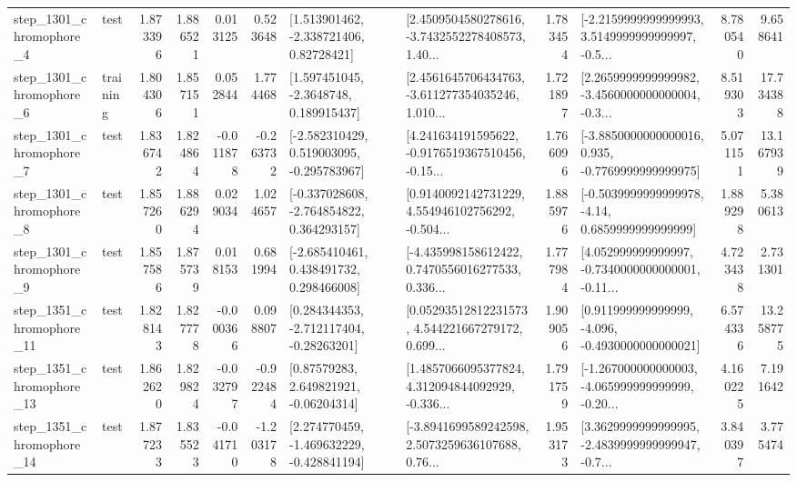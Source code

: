 \begin{tabular}{llrrrrllrlrr}
  step\_1301\_chromophore\_4 &      test &      1.873396 &    1.886521 &      0.013125 &  0.523648 &     [1.513901462, -2.338721406, 0.82728421] &  [2.4509504580278616, -3.7432552278408573, 1.40... &       1.783454 &  [-2.2159999999999993, 3.5149999999999997, -0.5... &            8.780540 &          9.658641 \\
  step\_1301\_chromophore\_6 &  training &      1.804306 &    1.857151 &      0.052844 &  1.774468 &      [1.597451045, -2.3648748, 0.189915437] &  [2.4561645706434763, -3.611277354035246, 1.010... &       1.721897 &  [2.2659999999999982, -3.4560000000000004, -0.3... &            8.519303 &         17.734388 \\
  step\_1301\_chromophore\_7 &      test &      1.836742 &    1.824864 &     -0.011878 & -0.263732 &   [-2.582310429, 0.519003095, -0.295783967] &  [4.241634191595622, -0.9176519367510456, -0.15... &       1.766096 &  [-3.8850000000000016, 0.935, -0.7769999999999975] &            5.071151 &         13.167939 \\
  step\_1301\_chromophore\_8 &      test &      1.857260 &    1.886294 &      0.029034 &  1.024657 &   [-0.337028608, -2.764854822, 0.364293157] &  [0.9140092142731229, 4.554946102756292, -0.504... &       1.885976 &   [-0.5039999999999978, -4.14, 0.6859999999999999] &            1.889298 &          5.380613 \\
  step\_1301\_chromophore\_9 &      test &      1.857586 &    1.875739 &      0.018153 &  0.681994 &    [-2.685410461, 0.438491732, 0.298466008] &  [-4.435998158612422, 0.7470556016277533, 0.336... &       1.777984 &  [4.052999999999997, -0.7340000000000001, -0.11... &            4.723438 &          2.731301 \\
 step\_1351\_chromophore\_11 &      test &      1.828143 &    1.827778 &     -0.000366 &  0.098807 &    [0.284344353, -2.712117404, -0.28263201] &  [0.05293512812231573, 4.544221667279172, 0.699... &       1.909056 &   [0.911999999999999, -4.096, -0.4930000000000021] &            6.574336 &         13.258775 \\
 step\_1351\_chromophore\_13 &      test &      1.862620 &    1.829824 &     -0.032797 & -0.922484 &      [0.87579283, 2.649821921, -0.06204314] &  [1.4857066095377824, 4.312094844092929, -0.336... &       1.791759 &  [-1.267000000000003, -4.065999999999999, -0.20... &            4.160225 &          7.191642 \\
 step\_1351\_chromophore\_14 &      test &      1.877233 &    1.835523 &     -0.041710 & -1.203178 &   [2.274770459, -1.469632229, -0.428841194] &  [-3.8941699589242598, 2.5073259636107688, 0.76... &       1.953173 &  [3.3629999999999995, -2.4839999999999947, -0.7... &            3.840397 &          3.775474 \\

\end{tabular}
